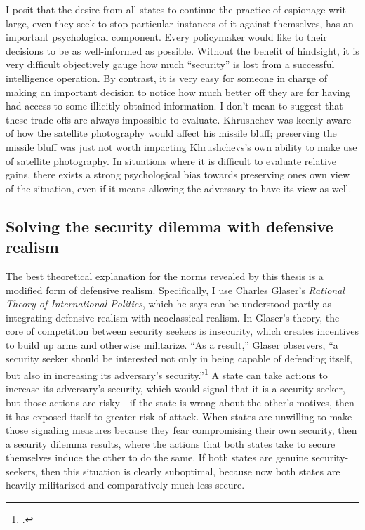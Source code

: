 \documentclass{memoir}
\begin{document}
\begin{refsegment}
I posit that the desire from all states to continue the practice of espionage writ large, even they seek to stop particular instances of it against themselves, has an important psychological component. Every policymaker would like to their decisions to be as well-informed as possible. Without the benefit of hindsight, it is very difficult objectively gauge how much ``security'' is lost from a successful intelligence operation. By contrast, it is very easy for someone in charge of making an important decision to notice how much better off they are for having had access to some illicitly-obtained information. I don't mean to suggest that these trade-offs are always impossible to evaluate. Khrushchev was keenly aware of how the satellite photography would affect his missile bluff; preserving the missile bluff was just not worth impacting Khrushchevs's own ability to make use of satellite photography. In situations where it is difficult to evaluate relative gains, there exists a strong psychological bias towards preserving ones own view of the situation, even if it means allowing the adversary to have its view as well.

\subsection{Solving the security dilemma with defensive realism}
The best theoretical explanation for the norms revealed by this thesis is a modified form of defensive realism. Specifically, I use Charles Glaser's \emph{Rational Theory of International Politics}, which he says can be understood partly as integrating defensive realism with neoclassical realism. In Glaser's theory, the core of competition between security seekers is insecurity, which creates incentives to build up arms and otherwise militarize. ``As a result,'' Glaser observers, ``a security seeker should be interested not only in being capable of defending itself, but also in increasing its adversary's security.''\footcite[p.~7]{glaser_rational_2010} A state can take actions to increase its adversary's security, which would signal that it is a security seeker, but those actions are risky---if the state is wrong about the other's motives, then it has exposed itself to greater risk of attack. When states are unwilling to make those signaling measures because they fear compromising their own security, then a security dilemma results, where the actions that both states take to secure themselves induce the other to do the same. If both states are genuine security-seekers, then this situation is clearly suboptimal, because now both states are heavily militarized and comparatively much less secure.


\end{refsegment}
\end{document}
